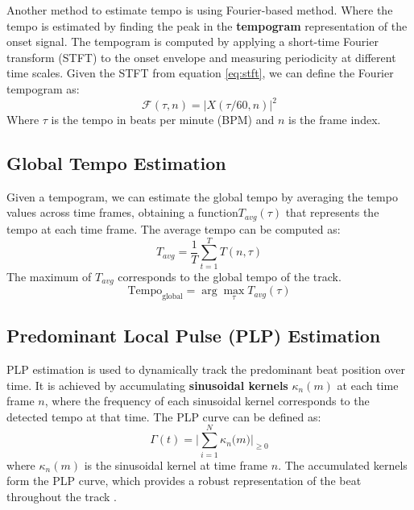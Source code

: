 \documentclass[
paper=A4,               %
pagesize=auto,          %
fontsize=12pt,          %
DIV=16,                 %
twoside=false,           %
BCOR=20mm,              %
parskip=false,          %
chapterprefix=true,     %
appendixprefix=true,    %
listof=totoc,           %
bibliography=totoc,     %
headinclude=true,       %
footinclude=false,      %
headsepline=false,       %
footsepline=false,      %
headings=small,         %
numbers=noenddot        %
] {scrbook}
\begin{document}
Another method to estimate tempo is using Fourier-based method. Where the tempo is estimated by finding the peak in the \textbf{tempogram} representation of the onset signal. The tempogram is computed by applying a short-time Fourier transform (STFT) to the onset envelope and measuring periodicity at different time scales. Given the STFT from equation \ref{eq:stft}, we can define the Fourier tempogram as:
\begin{equation}
    \mathcal{F}(\tau, n) = |X(\tau / 60, n)|^2
\end{equation}
Where $\tau$ is the tempo in beats per minute (BPM) and $n$ is the frame index.

\subsection*{Global Tempo Estimation}
Given a tempogram, we can estimate the global tempo by averaging the tempo values across time frames, obtaining a function$T_{avg}(\tau)$ that represents the tempo at each time frame\cite{bookfmp}. The average tempo can be computed as:
\begin{equation}
    T_{avg} = \frac{1}{T} \sum_{t=1}^{T} T(n, \tau)
\end{equation}
The maximum of $T_{avg}$ corresponds to the global tempo of the track.
\begin{equation}
    \text{Tempo}_{\text{global}} = \arg\max_{\tau} T_{avg}(\tau)
\end{equation}

\subsection*{Predominant Local Pulse (PLP) Estimation}
PLP estimation is used to dynamically track the predominant beat position over time. It is achieved by accumulating \textbf{sinusoidal kernels} $\kappa_n(m)$ at each time frame $n$, where the frequency of each sinusoidal kernel corresponds to the detected tempo at that time. The PLP curve can be defined as:
\begin{equation}
\Gamma(t) = \big|\sum_{i=1}^{N} \kappa_n\bigl(m\bigr)\big|_{\ge 0}
\end{equation}
where $\kappa_n(m)$ is the sinusoidal kernel at time frame $n$. The accumulated kernels form the PLP curve, which provides a robust representation of the beat throughout the track \cite{muller2015beat}.
\end{document}
